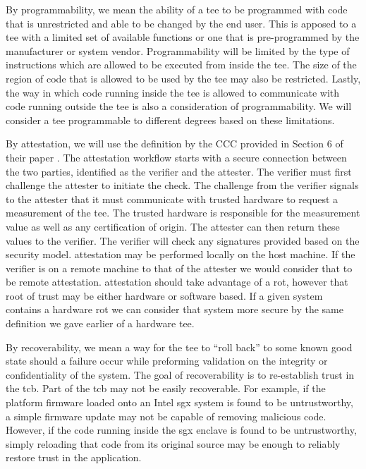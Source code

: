 By programmability, we mean the ability of a \gls{tee} to be programmed with code that is unrestricted and able to be changed by the end user. This is apposed to a \gls{tee} with a limited set of available functions or one that is pre-programmed by the manufacturer or system vendor. Programmability will be limited by the type of instructions which are allowed to be executed from inside the \gls{tee}. The size of the region of code that is allowed to be used by the \gls{tee} may also be restricted. Lastly, the way in which code running inside the \gls{tee} is allowed to communicate with code running outside the \gls{tee} is also a consideration of programmability. We will consider a \gls{tee} programmable to different degrees based on these limitations.

By \gls{attestation}, we will use the definition by the CCC provided in Section 6 of their paper \cite{cccTAC}. The attestation workflow starts with a secure connection between the two parties, identified as the verifier and the attester. The verifier must first challenge the attester to initiate the check. The challenge from the verifier signals to the attester that it must communicate with trusted hardware to request a \gls{measurement} of the \gls{tee}. The trusted hardware is responsible for the \gls{measurement} value as well as any certification of origin. The attester can then return these values to the verifier. The verifier will check any signatures provided based on the security model. \Gls{attestation} may be performed locally on the host machine. If the verifier is on a remote machine to that of the attester we would consider that to be remote \gls{attestation}. \Gls{attestation} should take advantage of a \gls{rot}, however that root of trust may be either hardware or software based. If a given system contains a hardware \gls{rot} we can consider that system more secure by the same definition we gave earlier of a hardware \gls{tee}.

By recoverability, we mean a way for the \gls{tee} to ``roll back'' to some known good state should a failure occur while preforming validation on the integrity or confidentiality of the system. The goal of recoverability is to re-establish trust in the \gls{tcb}. Part of the \gls{tcb} may not be easily recoverable. For example, if the platform firmware loaded onto an Intel \gls{sgx} system is found to be untrustworthy, a simple firmware update may not be capable of removing malicious code. However, if the code running inside the \gls{sgx} enclave is found to be untrustworthy, simply reloading that code from its original source may be enough to reliably restore trust in the application.

